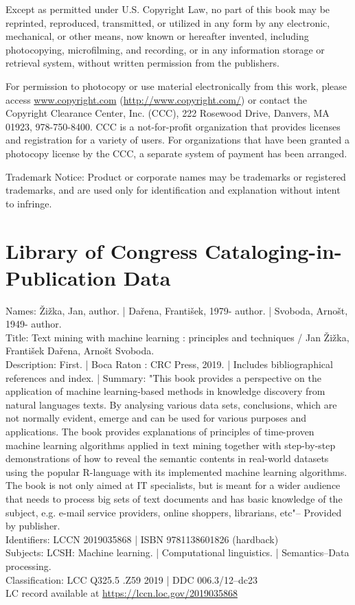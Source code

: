 \documentclass[10pt]{book}
\begin{document}
Except as permitted under U.S. Copyright Law, no part of this book may be reprinted, reproduced, transmitted, or utilized in any form by any electronic, mechanical, or other means, now known or hereafter invented, including photocopying, microfilming, and recording, or in any information storage or retrieval system, without written permission from the publishers.

For permission to photocopy or use material electronically from this work, please access \href{http://www.copyright.com}{www.copyright.com} (\href{http://www.copyright.com/}{http://www.copyright.com/}) or contact the Copyright Clearance Center, Inc. (CCC), 222 Rosewood Drive, Danvers, MA 01923, 978-750-8400. CCC is a not-for-profit organization that provides licenses and registration for a variety of users. For organizations that have been granted a photocopy license by the CCC, a separate system of payment has been arranged.

Trademark Notice: Product or corporate names may be trademarks or registered trademarks, and are used only for identification and explanation without intent to infringe.

\section*{Library of Congress Cataloging-in-Publication Data}
Names: Žižka, Jan, author. | Dařena, František, 1979- author. | Svoboda, Arnošt, 1949- author.\\
Title: Text mining with machine learning : principles and techniques / Jan Žižka, František Dařena, Arnošt Svoboda.\\
Description: First. | Boca Raton : CRC Press, 2019. | Includes bibliographical references and index. | Summary: "This book provides a perspective on the application of machine learning-based methods in knowledge discovery from natural languages texts. By analysing various data sets, conclusions, which are not normally evident, emerge and can be used for various purposes and applications. The book provides explanations of principles of time-proven machine learning algorithms applied in text mining together with step-by-step demonstrations of how to reveal the semantic contents in real-world datasets using the popular R-language with its implemented machine learning algorithms. The book is not only aimed at IT specialists, but is meant for a wider audience that needs to process big sets of text documents and has basic knowledge of the subject, e.g. e-mail service providers, online shoppers, librarians, etc"-- Provided by publisher.\\
Identifiers: LCCN 2019035868 | ISBN 9781138601826 (hardback)\\
Subjects: LCSH: Machine learning. | Computational linguistics. | Semantics--Data processing.\\
Classification: LCC Q325.5 .Z59 2019 | DDC 006.3/12--dc23\\
LC record available at \href{https://lccn.loc.gov/2019035868}{https://lccn.loc.gov/2019035868}
\end{document}
